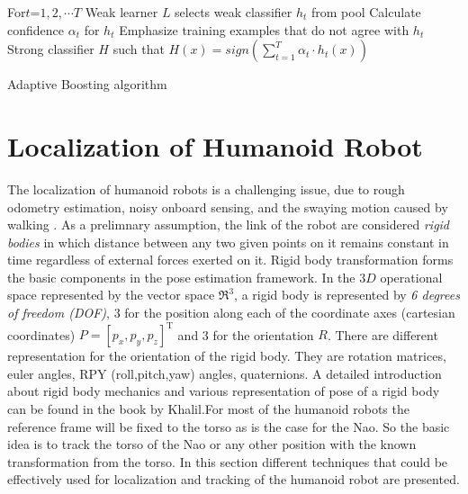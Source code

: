 \begin{algorithm}[H]
 \label{alg:adaboost}
For{$t$=$1,2,\cdots T$}{
	Weak learner $L$ selects weak classifier $h_t$ from pool\;
	Calculate confidence $\alpha_t$ for $h_t$\;
	Emphasize training examples that do not agree with $h_t$\;
}
\Return Strong classifier $H$ such that $H(x)=sign(\sum_{t=1}^{T}\alpha_t\cdot h_t(x))$
 \caption{Adaptive Boosting algorithm}
\end{algorithm}

\section{Localization of Humanoid Robot} %
The localization of humanoid robots is a challenging issue, due to rough odometry estimation, noisy onboard sensing, and the swaying motion caused by walking \cite{cervera2012localization}. As a prelimnary assumption, the link of the robot are considered \emph{rigid bodies} in which distance between any two given points on it remains constant in time regardless of external forces exerted on it. Rigid body transformation forms the basic components in the pose estimation framework. In the $3D$ operational space represented by the vector space $\Re^3$, a rigid body is represented by \emph{6 degrees of freedom (DOF)}, 3 for the position along each of the coordinate axes (cartesian coordinates) $P = [p_x,p_y,p_z]^{\text{T}}$ and 3 for the orientation $R$. There are different representation for the orientation of the rigid body. They are rotation matrices, euler angles, RPY (roll,pitch,yaw) angles, quaternions. A detailed introduction about rigid body mechanics and various representation of pose of a rigid body can be found in the book by Khalil\cite{khalil2004modeling}.For most of the humanoid robots the reference frame will be fixed to the torso as is the case for the Nao. So the basic idea is to track the torso of the Nao or any other position with the known transformation from the torso. In this section different techniques that could be effectively used for localization and tracking of the humanoid robot are presented.

